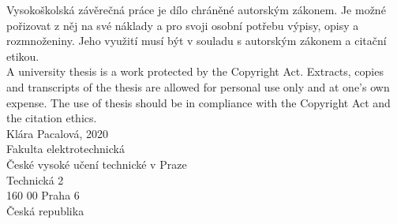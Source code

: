 \vfill

Vysokoškolská závěrečná práce je dílo chráněné autorským zákonem. Je možné pořizovat z něj na své náklady a pro svoji osobní potřebu výpisy, opisy a rozmnoženiny. Jeho využití musí být v souladu s autorským zákonem a citační etikou.\\

\noindent A university thesis is a work protected by the Copyright Act. Extracts, copies and transcripts of the thesis are allowed for personal use only and at one's own expense. The use of thesis should be in compliance with the Copyright Act and the citation ethics.\\

\noindent \textsuperscript{\textcopyright} Klára Pacalová, 2020\\
Fakulta elektrotechnická\\
České vysoké učení technické v Praze\\
Technická 2\\
160 00 Praha 6\\
Česká republika